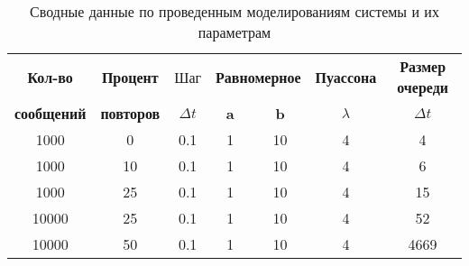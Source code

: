 \begin{table}[ht]
	\small
	\begin{center}
		\caption{Сводные данные по проведенным моделированиям системы и их параметрам}
		\label{tbl:result}
		\begin{tabular}{|c|c|c|c|c|c|c|}
            \hline
            \bfseries Кол-во & \bfseries Процент & Шаг & \multicolumn{2}{|c|}{\bfseries Равномерное} & \bfseries Пуассона & \bfseries Размер очереди \\\cline{4-7}
			
            \bfseries сообщений & \bfseries повторов & $\Delta t$ & \bfseries a & \bfseries b & \bfseries $\lambda$ & $\Delta t$ \\\hline
            
            1000  & 0   & 0.1 & 1 & 10 & 4 & 4    \\
            1000  & 10  & 0.1 & 1 & 10 & 4 & 6    \\
            1000  & 25  & 0.1 & 1 & 10 & 4 & 15   \\
            10000 & 25  & 0.1 & 1 & 10 & 4 & 52   \\
            10000 & 50  & 0.1 & 1 & 10 & 4 & 4669 \\
            \hline
		\end{tabular}
	\end{center}
\end{table}
